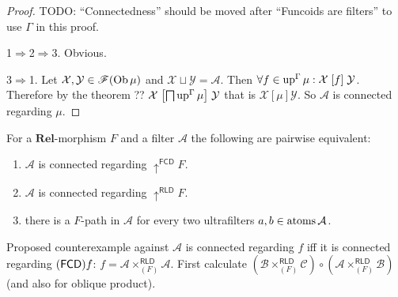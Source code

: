 \begin{proof}
  TODO: ``Connectedness'' should be moved after ``Funcoids are filters'' to
  use $\Gamma$ in this proof.

  1$\Rightarrow$2$\Rightarrow$3. Obvious.

  3$\Rightarrow$1. Let $\mathcal{X}, \mathcal{Y} \in \mathscr{F} (\operatorname{Ob}
  \mu)$ and $\mathcal{X} \sqcup \mathcal{Y} = \mathcal{A}$. Then $\forall f
  \in \operatorname{up}^{\Gamma} \mu : \mathcal{X} \mathrel{\left[f\right]} \mathcal{Y}$.
  Therefore by the theorem ?? $\mathcal{X} \mathrel{\left[ \bigsqcap
  \operatorname{up}^{\Gamma} \mu \right]} \mathcal{Y}$ that is $\mathcal{X}
  \mathrel{[\mu]} \mathcal{Y}$. So $\mathcal{A}$ is connected regarding $\mu$.
\end{proof}

\begin{conjecture}
  For a $\mathbf{Rel}$-morphism $F$ and a filter $\mathcal{A}$ the
  following are pairwise equivalent:
  \begin{enumerate}
    \item $\mathcal{A}$ is connected regarding $\uparrow^{\mathsf{FCD}}
    F$.

    \item $\mathcal{A}$ is connected regarding $\uparrow^{\mathsf{RLD}}
    F$.

    \item there is a $F$-path in $\mathcal{A}$ for every two
    ultrafilters $a,b\in\operatorname{atoms}\mathcal{A}$.
  \end{enumerate}
\end{conjecture}

Proposed counterexample against $\mathcal{A}$ is connected regarding
$f$ iff it is connected regarding $(\mathsf{FCD}) f$:
$f = \mathcal{A}\times^{\mathsf{RLD}}_{(F)}\mathcal{A}$.
First calculate
$(\mathcal{B}\times^{\mathsf{RLD}}_{(F)}\mathcal{C})\circ
(\mathcal{A}\times^{\mathsf{RLD}}_{(F)}\mathcal{B})$
(and also for oblique product).
